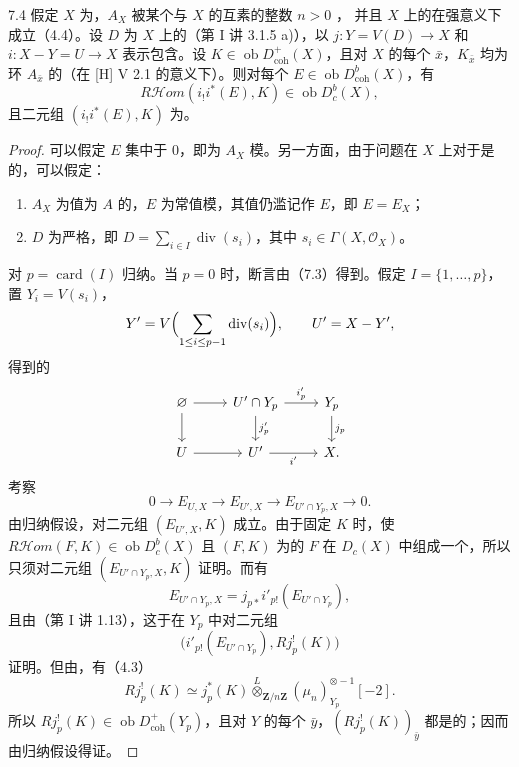 \begin{SGAresult}{}{7.4}
假定 $X$ 为，$A_X$ 被某个与 $X$ 的互素的整数 $n>0$ ，
并且 $X$ 上的在强意义下成立（4.4）。设 $D$ 为 $X$ 上的（第 I 讲 3.1.5 a)），以 $j:Y=V(D)\to X$ 和 $i:X-Y=U\to X$ 表示包含。设 $K\in\operatorname{ob}D^+_{\mathrm{coh}}(X)$，且对 $X$ 的每个 $\bar x$，$K_{\bar x}$ 均为环 $A_{\bar x}$ 的（在 [H] V 2.1 的意义下）。则对每个 $E\in\operatorname{ob}D^b_{\mathrm{coh}}(X)$，有
\[
R\mathcal Hom(i_!i^*(E),K)\in\operatorname{ob}D_c^b(X),
\]
且二元组 $(i_!i^*(E),K)$ 为。
\end{SGAresult}
\begin{proof}
可以假定 $E$ 集中于 $0$，即为 $A_X$ 模。另一方面，由于问题在 $X$ 上对于是的，可以假定：
\begin{enumerate}
\item[(a)] $A_X$ 为值为 $A$ 的，$E$ 为常值模，其值仍滥记作 $E$，即 $E=E_X$；
\item[(b)] $D$ 为严格，即 $D=\sum_{i\in I}\operatorname{div}(s_i)$，其中 $s_i\in\Gamma(X,\mathcal O_X)$。
\end{enumerate}
对 $p=\operatorname{card}(I)$ 归纳。当 $p=0$ 时，断言由（7.3）得到。假定 $I=\{1,\ldots,p\}$，置 $Y_i=V(s_i)$，
\[
Y'=V\Bigl(\sum_{1\leq i\leq p-1}\operatorname{div}(s_i)\Bigr),\qquad U'=X-Y',
\]
得到的
\[
\begin{tikzcd}
\varnothing\arrow[r]\arrow[d]&U'\cap Y_p\arrow[r,"i'_p"]\arrow[d,"j'_p"]&Y_p\arrow[d,"j_p"]\\
U\arrow[r]&U'\arrow[r,"i'"']&X.
\end{tikzcd}
\]
考察
\[
0\longrightarrow E_{U,X}\longrightarrow E_{U',X}
\longrightarrow E_{U'\cap Y_p,X}\longrightarrow0.
\]
由归纳假设，对二元组 $(E_{U',X},K)$ 成立。由于固定 $K$ 时，使 $R\mathcal Hom(F,K)\in\operatorname{ob}D_c^b(X)$ 且 $(F,K)$ 为的 $F$ 在 $D_c(X)$ 中组成一个，所以只须对二元组 $(E_{U'\cap Y_p,X},K)$ 证明。而有
\[
E_{U'\cap Y_p,X}=j_{p*}i'_{p!}(E_{U'\cap Y_p}),
\]
且由（第 I 讲 1.13），这于在 $Y_p$ 中对二元组
\[
\bigl(i'_{p!}(E_{U'\cap Y_p}),Rj_p^!(K)\bigr)
\]
证明。但由，有（4.3）
\[
Rj_p^!(K)\simeq j_p^*(K)
\mathbin{\mathop\otimes\limits^L}_{\mathbf Z/n\mathbf Z}
(\mu_n)_{Y_p}^{\otimes-1}[-2].
\]
所以 $Rj_p^!(K)\in\operatorname{ob}D^+_{\mathrm{coh}}(Y_p)$，且对 $Y$ 的每个 $\bar y$，$(Rj_p^!(K))_{\bar y}$ 都是的；因而由归纳假设得证。
\end{proof}

